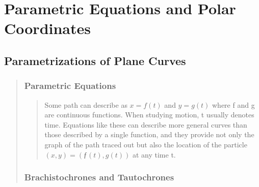 \documentclass{report}
\begin{document}
\chapter{Parametric Equations and Polar Coordinates }


\section{Parametrizations of Plane Curves }
\begin{quote}
	
	\subsection{Parametric Equations}
	\begin{quote}

		Some path can describe as $x = f(t)$ and $y = g(t)$ where f and g are continuous functions.  When studying motion, t usually denotes time. Equations like these can describe more general curves than those described by a single function, and they provide not only the graph of the path traced out but also the location of the particle $(x, y) = (ƒ(t), g(t))$ at any time t.

	\end{quote}

	\subsection{Brachistochrones and Tautochrones}
	\begin{quote}

	\end{quote}


\end{quote}

\end{document}

